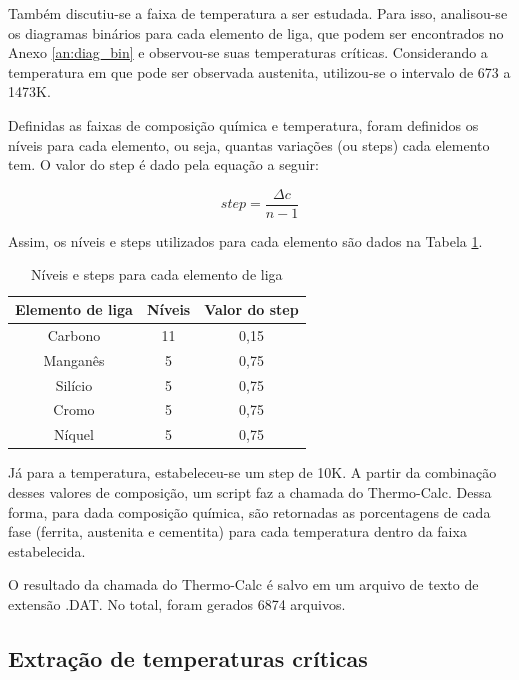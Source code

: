 \documentclass[brazil,tf,epusp]{usp}  %
\begin{document}
Também discutiu-se a faixa de temperatura a ser estudada. Para isso, analisou-se os diagramas binários para cada elemento de liga, que podem ser encontrados no Anexo \ref{an:diag_bin} e observou-se suas temperaturas críticas. Considerando a temperatura em que pode ser observada austenita, utilizou-se o intervalo de 673 a 1473K.

Definidas as faixas de composição química e temperatura, foram definidos os níveis para cada elemento, ou seja, quantas variações (ou steps) cada elemento tem. O valor do step é dado pela equação a seguir:

\begin{equation}
  step = \frac{\Delta c}{n - 1}
\end{equation}

Assim, os níveis e steps utilizados para cada elemento são dados na Tabela \ref{tab:niveis_e_steps}.

\begin{table}
  \caption{Níveis e steps para cada elemento de liga}

  \begin{tabular}{c c c}
  \hline
  \textbf{Elemento de liga} & \textbf{Níveis} & \textbf{Valor do step} \\
  \hline
  Carbono & 11 & 0,15 \\
  Manganês & 5 & 0,75 \\
  Silício & 5 & 0,75 \\
  Cromo & 5 & 0,75 \\
  Níquel & 5 & 0,75 \\
  \hline
  \end{tabular}

  \label{tab:niveis_e_steps}
\end{table}

Já para a temperatura, estabeleceu-se um step de 10K. A partir da combinação desses valores de composição, um script faz a chamada do Thermo-Calc\textregistered{}. Dessa forma, para dada composição química, são retornadas as porcentagens de cada fase (ferrita, austenita e cementita) para cada temperatura dentro da faixa estabelecida.

O resultado da chamada do Thermo-Calc\textregistered{} é salvo em um arquivo de texto de extensão .DAT. No total, foram gerados 6874 arquivos.

\subsection{Extra\c{c}\~ao de temperaturas cr\'iticas}
\end{document}

